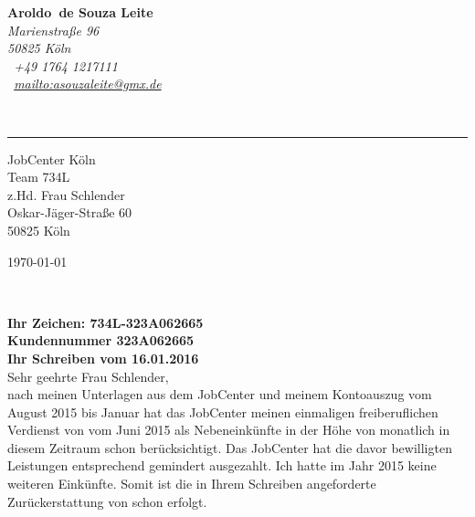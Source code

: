 \documentclass[12pt,a4paper]{article}
\def\firstname{Aroldo}
\def\familyname{de Souza Leite}
\begin{document}
\sffamily   %
\hfill%
\begin{minipage}[t]{.6\textwidth}
	\raggedleft%
	{\bfseries {\color{firstnamecolor}\firstname}~{\color{familynamecolor}\familyname}}\\[.35ex]
	\small\itshape%
	Marienstraße 96\\
	50825 Köln\\[.35ex]
	\Mobilefone~+49 1764 1217111\\
	\Letter~\href{mailto:asouzaleite@gmx.de}{mailto:asouzaleite@gmx.de}
\end{minipage}\\[0.5em]
%
{\color{firstnamecolor}\rule{\textwidth}{.25ex}}

\begin{minipage}[t]{.4\textwidth}
	\raggedright%
	\vspace*{1em}
        JobCenter Köln\\
        Team 734L\\
        z.Hd. Frau Schlender\\
        Oskar-Jäger-Straße 60\\[.35ex]
	\small%
	50825 Köln\\
\end{minipage}
%
\hfill
%
\begin{minipage}[t]{.4\textwidth}
	\raggedleft %
	\today
\end{minipage}\\[1em]
\raggedright

{\bfseries \color{familynamecolor}Ihr Zeichen: 734L-323A062665\\
  Kundennummer 323A062665\\
Ihr Schreiben vom 16.01.2016}\\[1.5em]

Sehr geehrte Frau Schlender,\\[1em]
%

nach meinen Unterlagen aus dem JobCenter und meinem Kontoauszug vom August 2015 bis Januar hat das JobCenter meinen einmaligen freiberuflichen Verdienst von   vom Juni 2015 als Nebeneinkünfte in der Höhe von monatlich   in diesem Zeitraum schon berücksichtigt. Das JobCenter hat die davor bewilligten Leistungen entsprechend gemindert ausgezahlt. Ich hatte im Jahr 2015 keine weiteren Einkünfte. Somit ist die in Ihrem Schreiben angeforderte Zurückerstattung von  schon erfolgt.
\end{document}
